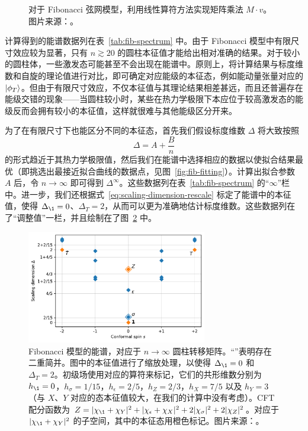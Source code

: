 \begin{figure}[ht]
  \caption[利用线性算符方法实现矩阵乘法]{对于 Fibonacci 弦网模型，利用线性算符方法实现矩阵乘法 $M\cdot v$。图片来源：\parencite{zeng2023virasoro}。}
  \label{fig:fib-linear-operator}
\end{figure}

计算得到的能谱数据列在表~\ref{tab:fib-spectrum} 中。由于 Fibonacci 模型中有限尺寸效应较为显著，只有 $n\gtrsim20$ 的圆柱本征值才能给出相对准确的结果。对于较小的圆柱体，一些激发态可能甚至不会出现在能谱中。原则上，将计算结果与标度维数和自旋的理论值进行对比，即可确定对应能级的本征态，例如能动量张量对应的 $\ket*{\phi_T}$。但由于有限尺寸效应，不仅本征值与其理论结果相差甚远，而且还普遍存在能级交错的现象——当圆柱较小时，某些在热力学极限下本应位于较高激发态的能级反而会拥有较小的本征值，这样就很难与其他能级区分开来。

为了在有限尺寸下也能区分不同的本征态，首先我们假设标度维数 $\Delta$ 将大致按照
\begin{equation}
  \Delta = A + \frac{B}{n}
\end{equation}
的形式趋近于其热力学极限值\cite{schuler2016universal}，然后我们在能谱中选择相应的数据以使拟合结果最优（即挑选出最接近拟合曲线的数据点，见图~\ref{fig:fib-fitting}）。计算出拟合参数 $A$ 后，令 $n\to\infty$ 即可得到 $\Delta^\infty$。这些数据列在表~\ref{tab:fib-spectrum} 的“$\infty$”栏中。进一步，我们还根据式~\eqref{eq:scaling-dimension-rescale} 标定了能谱中的本征值，使得 $\Delta_{\1}=0$、$\Delta_T=2$，从而可以更为准确地估计标度维数。这些数据列在了“调整值”一栏，并且绘制在了图~\ref{fig:fib-spectrum} 中。

\begin{figure}[ht]
  \centering
  \includegraphics[width=0.7\textwidth]{images/fibonacci/fib-spectrum.pdf}
  \caption[Fibonacci 模型的能谱]{Fibonacci 模型的能谱，对应于 $n\to\infty$ 圆柱转移矩阵。“\unskip”表明存在二重简并。图中的本征值进行了缩放处理，以使得 $\Delta_{\1}=0$ 和 $\Delta_T=2$。初级场使用对应的算符来标记，它们的共形维数分别为 $h_{\1}=0$，$h_\sigma=1/15$，$h_\epsilon=2/5$，$h_Z=2/3$，$h_X=7/5$ 以及 $h_Y=3$（与 $X$、$Y$ 对应的态本征值较大，在我们的计算中没有考虑）。CFT 配分函数为 $Z=|\chi_{\1}+\chi_Y|^2+|\chi_\epsilon+\chi_X|^2+2|\chi_\sigma|^2\discretionary{}{}{}+2|\chi_Z|^2$\cite{vanhove2018mapping}。对应于 $|\chi_{\1}+\chi_Y|^2$ 的子空间，其中的本征态用橙色标记。图片来源：\parencite{zeng2023virasoro}。}
  \label{fig:fib-spectrum}
\end{figure}

